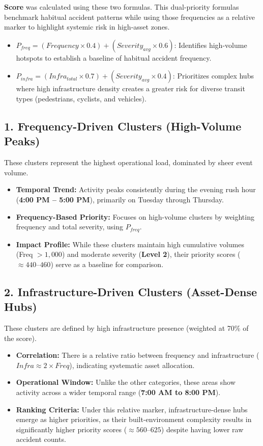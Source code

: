 \documentclass[conference]{IEEEtran}
\begin{document}
\textbf{Score} was calculated using these two formulas. This dual-priority formulas benchmark habitual accident patterns while using those frequencies as a relative marker to highlight systemic risk in high-asset zones.  
\begin{itemize}
	\item \textbf{$P_{freq} = (Frequency \times 0.4) + (Severity_{avg} \times 0.6)$}: Identifies high-volume hotspots to establish a baseline of habitual accident frequency.
	\item \textbf{$P_{infra} = (Infra_{total} \times 0.7) + (Severity_{avg} \times 0.4)$}: Prioritizes complex hubs where high infrastructure density creates a greater risk for diverse transit types (pedestrians, cyclists, and vehicles).
\end{itemize}  

\subsection*{1. Frequency-Driven Clusters (High-Volume Peaks)}
These clusters represent the highest operational load, dominated by sheer event volume.

\begin{itemize}
	\item \textbf{Temporal Trend:} Activity peaks consistently during the evening rush hour (\textbf{4:00 PM -- 5:00 PM}), primarily on Tuesday through Thursday.
	\item \textbf{Frequency-Based Priority:} 
	Focuses on high-volume clusters by weighting frequency and total severity, using $P_{freq}$.
	\item \textbf{Impact Profile:} While these clusters maintain high cumulative volumes (Freq $> 1,000$) and moderate severity (\textbf{Level 2}), their priority scores ($\approx 440 \text{--} 460$) serve as a baseline for comparison. 
\end{itemize}


\subsection*{2. Infrastructure-Driven Clusters (Asset-Dense Hubs)}
These clusters are defined by high infrastructure presence (weighted at 70\% of the score).

\begin{itemize}
	\item \textbf{Correlation:} There is a relative ratio between frequency and infrastructure ($Infra \approx 2 \times Freq$), indicating systematic asset allocation.
	\item \textbf{Operational Window:} Unlike the other categories, these areas show activity across a wider temporal range (\textbf{7:00 AM to 8:00 PM}).
	\item \textbf{Ranking Criteria:} Under this relative marker, infrastructure-dense hubs emerge as higher priorities, as their built-environment complexity results in significantly higher priority scores ($\approx 560 \text{--} 625$) despite having lower raw accident counts.
\end{itemize}
\end{document}
